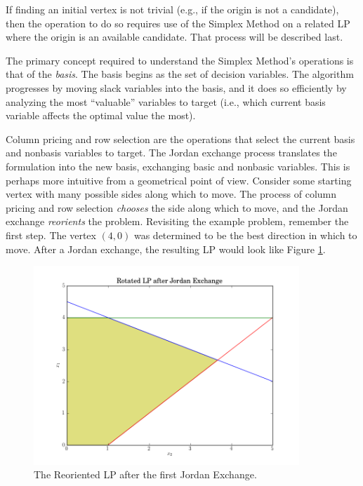 If finding an initial vertex is not trivial (e.g., if the origin is not a
candidate), then the operation to do so requires use of the Simplex Method on a
related LP where the origin is an available candidate. That process will be
described last.

The primary concept required to understand the Simplex Method's operations is
that of the \textit{basis}. The basis begins as the set of decision
variables. The algorithm progresses by moving slack variables into the basis,
and it does so efficiently by analyzing the most ``valuable'' variables to
target (i.e., which current basis variable affects the optimal value the most).

Column pricing and row selection are the operations that select the current
basis and nonbasis variables to target. The Jordan exchange process translates
the formulation into the new basis, exchanging basic and nonbasic
variables. This is perhaps more intuitive from a geometrical point of
view. Consider some starting vertex with many possible sides along which to
move. The process of column pricing and row selection \textit{chooses} the side
along which to move, and the Jordan exchange \textit{reorients} the
problem. Revisiting the example problem, remember the first step. The vertex
$(4, 0)$ was determined to be the best direction in which to move. After a
Jordan exchange, the resulting LP would look like Figure \ref{fig:rotated}.

\begin{figure}[H]
  \begin{center}
    \includegraphics[height=7.5cm]{./backmatter/figs/rotated.png}
  \caption{The Reoriented LP after the first Jordan Exchange.}
  \label{fig:rotated}
  \end{center}
\end{figure}


